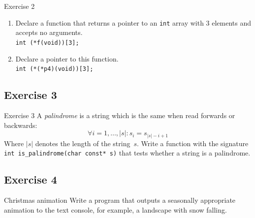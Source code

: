 \documentclass[10pt]{beamer}
\begin{document}
\begin{frame}{Exercise 2}
\begin{enumerate}
		\item Declare a function that returns a pointer to an \texttt{int} array with 3 elements and accepts no arguments. \\ \vspace{0.3cm}
			\alert{\texttt{int (*f(void))[3];}}
			
		\item Declare a pointer to this function. \\ \vspace{0.3cm}
			\alert{\texttt{int (*(*p4)(void))[3];}}
			
	\end{enumerate}
\end{frame}

\subsection*{Exercise 3}
\frame{\subsectionpage}
\begin{frame}{Exercise 3}
    A \emph{palindrome} is a string which is the same when read forwards or backwards:
	\[ \forall i=1,\ldots,|s| : s_i = s_{|s|-i+1} \]
	Where $|s|$ denotes the length of the string~$s$.
	Write a function with the signature \texttt{int is_palindrome(char const* s)} that tests whether a string is a palindrome.
	
\end{frame}

\subsection*{Exercise 4}
\frame{\subsectionpage}
\begin{frame}{Christmas animation}
 Write a program that outputs a seasonally appropriate animation to the text console,
	for example, a landscape with snow falling.
	
	 \\
	\framebreak
	 \\
	\framebreak
	 \\
\end{frame}

    
\end{document}
